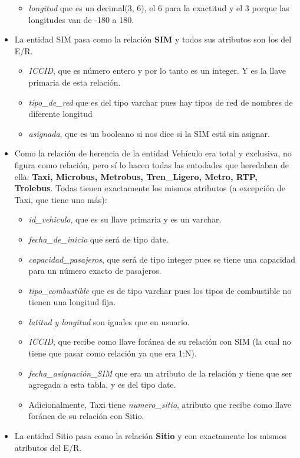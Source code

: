 \documentclass[11pt]{article}
\begin{document}
\begin{itemize}
\begin{itemize}
    \item \textit{longitud} que es un decimal(3, 6), el 6 para la exactitud y el 3 porque las longitudes van de -180 a 180.
    \end{itemize}   
\item La entidad SIM pasa como la relación \textbf{SIM} y todos sus atributos son los del E/R.
    \begin{itemize}
    \item \textit{ICCID}, que es número entero y por lo tanto es un integer. Y es la llave primaria de esta relación.
    \item \textit{tipo\_de\_red} que es del tipo varchar pues hay tipos de red de nombres de diferente longitud 
    \item \textit{asignada}, que es un booleano si nos dice si la SIM está sin asignar.
    \end{itemize}   
\item Como la relación de herencia de la entidad Vehículo era total y exclusiva, no figura como relación, pero sí lo hacen todas las entodades que heredaban de ella: \textbf{Taxi, Microbus, Metrobus, Tren\_Ligero, Metro, RTP, Trolebus}. Todas tienen exactamente los mismos atributos (a excepción de Taxi, que tiene uno más):
    \begin{itemize}
    \item \textit{id\_vehiculo}, que es su llave primaria y es un varchar.
    \item \textit{fecha\_de\_inicio} que será de tipo date.
    \item \textit{capacidad\_pasajeros}, que será de tipo integer pues se tiene una capacidad para un número exacto de pasajeros.
    \item \textit{tipo\_combustible} que es de tipo varchar pues los tipos de combustible no tienen una longitud fija. 
    \item \textit{latitud y longitud} son iguales que en usuario.
    \item \textit{ICCID}, que recibe como llave foránea de su relación con SIM (la cual no tiene que pasar como relación ya que era 1:N).
    \item \textit{fecha\_asignación\_SIM} que era un atributo de la relación y tiene que ser agregada a esta tabla, y es del tipo date.
    \item Adicionalmente, Taxi tiene \textit{numero\_sitio}, atributo que recibe como llave foránea de su relación con Sitio. 
    \end{itemize}   
\item La entidad Sitio pasa como la relación \textbf{Sitio} y con exactamente los mismos atributos del E/R.

\end{itemize}
\end{document}
